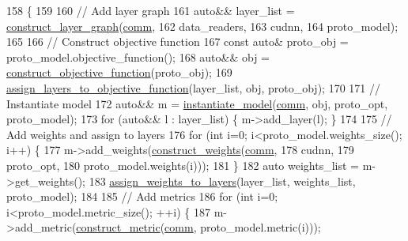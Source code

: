 \begin{DoxyCode}
158                                                            \{
159 
160   \textcolor{comment}{// Add layer graph}
161   \textcolor{keyword}{auto}&& layer\_list = \hyperlink{namespacelbann_1_1proto_a99e65cd4abb769d020ab76ff20c39d0b}{construct\_layer\_graph}(\hyperlink{file__io_8cpp_ab048c6f9fcbcfaa57ce68b00263dbebe}{comm},
162                                             data\_readers,
163                                             cudnn,
164                                             proto\_model);
165 
166   \textcolor{comment}{// Construct objective function}
167   \textcolor{keyword}{const} \textcolor{keyword}{auto}& proto\_obj = proto\_model.objective\_function();
168   \textcolor{keyword}{auto}&& obj = \hyperlink{namespacelbann_1_1proto_a2b55ede441a057291e047cf4e7352481}{construct\_objective\_function}(proto\_obj);
169   \hyperlink{namespacelbann_1_1proto_1_1anonymous__namespace_02model__factory_8cpp_03_a3406a809935f319486cf8fd017b58417}{assign\_layers\_to\_objective\_function}(layer\_list, obj, proto\_obj);
170   
171   \textcolor{comment}{// Instantiate model}
172   \textcolor{keyword}{auto}&& m = \hyperlink{namespacelbann_1_1proto_1_1anonymous__namespace_02model__factory_8cpp_03_a6a08f0b26d015824ef28ddbb66b6d4c0}{instantiate\_model}(\hyperlink{file__io_8cpp_ab048c6f9fcbcfaa57ce68b00263dbebe}{comm}, obj, proto\_opt, proto\_model);
173   \textcolor{keywordflow}{for} (\textcolor{keyword}{auto}&& l : layer\_list) \{ m->add\_layer(l); \}
174 
175   \textcolor{comment}{// Add weights and assign to layers}
176   \textcolor{keywordflow}{for} (\textcolor{keywordtype}{int} i=0; i<proto\_model.weights\_size(); i++) \{
177     m->add\_weights(\hyperlink{namespacelbann_1_1proto_a1e95259d3e7fd20a9c361850940a398a}{construct\_weights}(\hyperlink{file__io_8cpp_ab048c6f9fcbcfaa57ce68b00263dbebe}{comm},
178                                      cudnn,
179                                      proto\_opt,
180                                      proto\_model.weights(i)));
181   \}
182   \textcolor{keyword}{auto} weights\_list = m->get\_weights();
183   \hyperlink{namespacelbann_1_1proto_1_1anonymous__namespace_02model__factory_8cpp_03_a19d0eaf0259647155039ed45eb980b05}{assign\_weights\_to\_layers}(layer\_list, weights\_list, proto\_model);
184 
185   \textcolor{comment}{// Add metrics}
186   \textcolor{keywordflow}{for} (\textcolor{keywordtype}{int} i=0; i<proto\_model.metric\_size(); ++i) \{
187     m->add\_metric(\hyperlink{namespacelbann_1_1proto_a5b2f4094ce02245e778cfd2fa254d7b4}{construct\_metric}(\hyperlink{file__io_8cpp_ab048c6f9fcbcfaa57ce68b00263dbebe}{comm}, proto\_model.metric(i)));

\end{DoxyCode}
